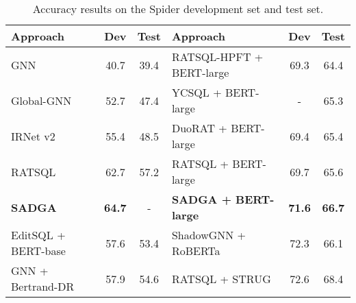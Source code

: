 \documentclass{article}
\begin{document}
\begin{table*}[hbt]
    \caption{Accuracy results on the Spider development set and test set.}
    \label{accuracy} 
    \renewcommand\arraystretch{1.1}
    \footnotesize
    \centering
    \begin{tabular}{lcc|lcc}
        \toprule
        \textbf{Approach} & \textbf{Dev} & \textbf{Test} & \textbf{Approach} & \textbf{Dev} & \textbf{Test} \\ 
        \hline\hline 
        GNN \citep{bogin2019representing}                            & 40.7                          & 39.4          
        & RATSQL-HPFT + BERT-large                                   & 69.3                          & 64.4          \\
        
        Global-GNN \citep{bogin2019global}                           & 52.7                          & 47.4          
        & YCSQL  + BERT-large                                        & -                             & 65.3          \\
        
        IRNet v2 \citep{guo2019towards}                              & 55.4                          & 48.5          
        & DuoRAT  + BERT-large \citep{scholak2021duorat}             & 69.4                          & 65.4        \\
        
        RATSQL \citep{wang2020rat}                                  & 62.7                          & 57.2          
        & RATSQL + BERT-large \citep{wang2020rat}                   & 69.7                          & 65.6          \\
        
        \textbf{SADGA}                                                & \textbf{64.7}                 & -             
        & \textbf{SADGA + BERT-large}                                 & \textbf{71.6}                 & \textbf{66.7}             \\
        \hline\hline     
        EditSQL + BERT-base \citep{zhang2019editing}                 & 57.6                          & 53.4          
        & ShadowGNN + RoBERTa \citep{chen2021shadowgnn}              & 72.3                          & 66.1          \\   
        
        GNN + Bertrand-DR \citep{kelkar2020bertrand}                 & 57.9                          & 54.6          
        & RATSQL + STRUG \citep{deng2021structure}                  & 72.6                          & 68.4          \\
        

\end{tabular}
\end{table*}
\end{document}
